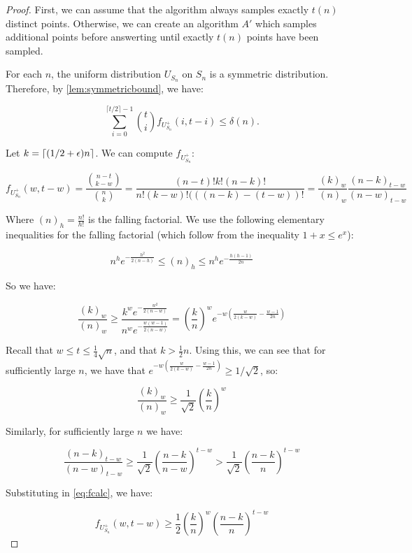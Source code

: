\begin{proof}

First, we can assume that the algorithm always samples exactly $t(n)$ distinct points. Otherwise,
we can create an algorithm $A'$ which samples additional points before answerting
until exactly $t(n)$ points have been sampled.

For each $n$, the uniform distribution $U_{S_n}$ on $S_n$ is a symmetric distribution. 
Therefore, by \cref{lem:symmetricbound}, we have:

$$
\sum_{i=0}^{\lceil t/2 \rceil-1} \binom{t}{i} f_{U^+_{S_n}}(i, t-i) \leq \delta(n).
$$

Let $k = \lceil(1/2+\epsilon)n\rceil$. We can compute $f_{U^+_{S_n}}$:


\begin{equation}
\label{eq:fcalc}
f_{U^+_{S_n}}(w, t-w) = \frac{\binom{n-t}{k-w}}{\binom{n}{k}} = \frac{(n-t)!k!(n-k)!}{n!(k-w)!(((n-k)-(t-w))!}
    = \frac{(k)_w}{(n)_w} \frac{(n-k)_{t-w}}{(n-w)_{t-w}}
\end{equation}

Where $(n)_h = \frac{n!}{h!}$ is the falling factorial. We use the following elementary inequalities 
for the falling factorial (which follow from the inequality $1+x \leq e^x$):

$$
n^h e^{-\frac{h^2}{2(n-h)}} \leq (n)_h \leq n^h e^{-\frac{h(h-1)}{2n}}
$$

So we have:

$$
\frac{(k)_w}{(n)_w} \geq \frac{k^we^{-\frac{w^2}{2(n-w)}}}{n^we^{-\frac{w(w-1)}{2(n-w)}}} = \left(\frac{k}{n}\right)^w e^{-w\left(\frac{w}{2(k-w)}-\frac{w-1}{2n}\right)}
$$

Recall that $w \leq t \leq \frac{1}{4}\sqrt{n}$, and that $k > \frac{1}{2}n$. Using this, we can see that for sufficiently large $n$, we have that $e^{-w\left(\frac{w}{2(k-w)}-\frac{w-1}{2n}\right)} \geq 1/\sqrt{2}$, so:

$$
\frac{(k)_w}{(n)_w} \geq \frac{1}{\sqrt{2}}  \left(\frac{k}{n}\right)^w
$$

Similarly, for sufficiently large $n$ we have:

$$
\frac{(n-k)_{t-w}}{(n-w)_{t-w}} \geq \frac{1}{\sqrt{2}} \left(\frac{n-k}{n-w} \right)^{t-w} > \frac{1}{\sqrt{2}} \left(\frac{n-k}{n} \right)^{t-w}
$$

Substituting in \eqref{eq:fcalc}, we have:

$$
f_{U^+_{S_n}}(w, t-w)  \geq \frac{1}{2} \left(\frac{k}{n}\right)^w \left(\frac{n-k}{n} \right)^{t-w}
$$
    

\end{proof}
